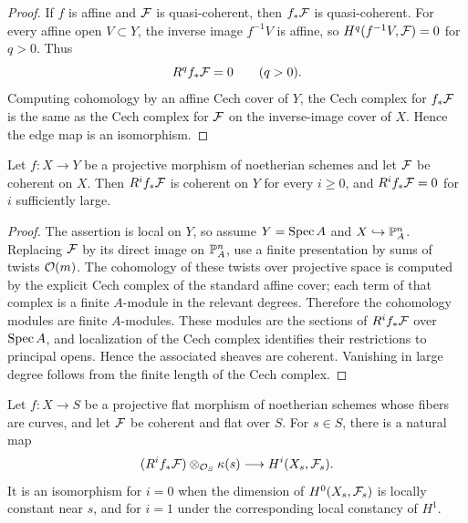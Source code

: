 \begin{proof}
If \(f\) is affine and \(\mathcal{F}\) is quasi-coherent, then \(f_*\mathcal{F}\) is
quasi-coherent.  For every affine open \(V\subset Y\), the inverse image
\(f^{-1}V\) is affine, so \(H^q(f^{-1}V,\mathcal{F})=0\) for \(q>0\).  Thus
\[
    R^qf_*\mathcal{F}=0\qquad(q>0).
\]
Computing cohomology by an affine Cech cover of \(Y\), the Cech complex for
\(f_*\mathcal{F}\) is the same as the Cech complex for \(\mathcal{F}\) on the inverse-image
cover of \(X\).  Hence the edge map is an isomorphism.
\end{proof}

\begin{theorem}
Let \(f:X\to Y\) be a projective morphism of noetherian schemes and let \(\mathcal{F}\)
be coherent on \(X\).  Then \(R^if_*\mathcal{F}\) is coherent on \(Y\) for every
\(i\ge0\), and \(R^if_*\mathcal{F}=0\) for \(i\) sufficiently large.
\end{theorem}

\begin{proof}
The assertion is local on \(Y\), so assume \(Y=\operatorname{Spec} A\) and
\(X\hookrightarrow\mathbb{P}^n_A\).  Replacing \(\mathcal{F}\) by its direct image on
\(\mathbb{P}^n_A\), use a finite presentation by sums of twists \(\mathcal{O}(m)\).  The
cohomology of these twists over projective space is computed by the explicit
Cech complex of the standard affine cover; each term of that complex is a
finite \(A\)-module in the relevant degrees.  Therefore the cohomology modules
are finite \(A\)-modules.  These modules are the sections of \(R^if_*\mathcal{F}\) over
\(\operatorname{Spec} A\), and localization of the Cech complex identifies their restrictions
to principal opens.  Hence the associated sheaves are coherent.  Vanishing in
large degree follows from the finite length of the Cech complex.
\end{proof}

\begin{theorem}
Let \(f:X\to S\) be a projective flat morphism of noetherian schemes whose
fibers are curves, and let \(\mathcal{F}\) be coherent and flat over \(S\).  For
\(s\in S\), there is a natural map
\[
    (R^if_*\mathcal{F})\otimes_{\mathcal{O}_S}\kappa(s)
    \longrightarrow
    H^i(X_s,\mathcal{F}_s).
\]
It is an isomorphism for \(i=0\) when the dimension of
\(H^0(X_s,\mathcal{F}_s)\) is locally constant near \(s\), and for \(i=1\) under the
corresponding local constancy of \(H^1\).
\end{theorem}

